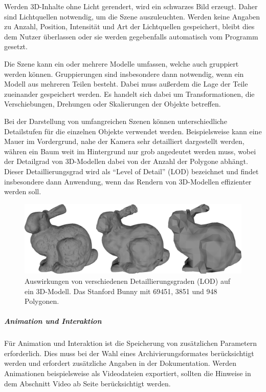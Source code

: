 Werden 3D-Inhalte ohne Licht gerendert, wird ein schwarzes Bild erzeugt. Daher sind Lichtquellen notwendig, um die Szene auszuleuchten. Werden keine Angaben zu Anzahl, Position, Intensität und Art der Lichtquellen gespeichert, bleibt dies dem Nutzer überlassen oder sie werden gegebenfalls automatisch vom Programm  gesetzt.

Die Szene kann ein oder mehrere Modelle umfassen, welche auch gruppiert werden können. Gruppierungen sind insbesondere dann notwendig, wenn ein Modell aus mehreren Teilen besteht. Dabei muss außerdem die Lage der Teile zueinander gespeichert werden. Es handelt sich dabei um Transformationen, die Verschiebungen, Drehungen oder Skalierungen der Objekte betreffen. 

Bei der Darstellung von umfangreichen Szenen können unterschiedliche Detailstufen für die einzelnen Objekte verwendet werden. Beispielsweise kann eine Mauer im Vordergrund, nahe der Kamera sehr detailliert dargestellt werden, währen ein Baum weit im Hintergrund nur grob angedeutet werden muss, wobei der Detailgrad von 3D-Modellen dabei von der Anzahl der Polygone abhängt. Dieser Detaillierungsgrad wird als "`Level of Detail"' (LOD) bezeichnet und findet insbesondere dann Anwendung, wenn das Rendern von 3D-Modellen effizienter werden soll.

\begin{figure}[!hbt]
  \begin{center}
    \includegraphics[width=\textwidth]{bilder/3D_LOD}
  \end{center}
  \caption{Auswirkungen von verschiedenen Detaillierungsgraden (LOD) auf ein 3D-Modell. Das Stanford Bunny mit 69451, 3851 und 948 Polygonen.}
\end{figure}


\subparagraph{Animation und Interaktion}
Für Animation und Interaktion ist die Speicherung von zusätzlichen Parametern erforderlich. Dies muss bei der Wahl eines Archivierungsformates berücksichtigt werden und erfordert zusätzliche Angaben in der Dokumentation. Werden Animationen beispielsweise als Videodateien exportiert, sollten die Hinweise in dem Abschnitt Video ab Seite \pageref{video} berücksichtigt werden.


